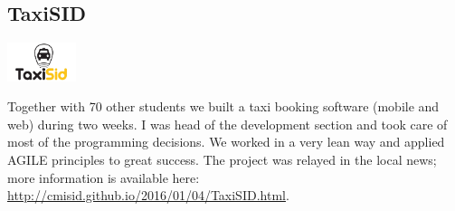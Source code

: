 \subsection{TaxiSID}
\noindent
\begin{minipage}{.15\textwidth}
\centerline{\includegraphics[width=20mm]{img/taxisid}}
\end{minipage}%
\hspace{5mm}
\begin{minipage}{.8\textwidth}
\justify
Together with 70 other students we built a taxi booking software (mobile and web) during two weeks. I was head of the development section and took care of most of the programming decisions. We worked in a very lean way and applied AGILE principles to great success. The project was relayed in the local news; more information is available here: \textcolor{green}{\url{http://cmisid.github.io/2016/01/04/TaxiSID.html}}.
\end{minipage}

